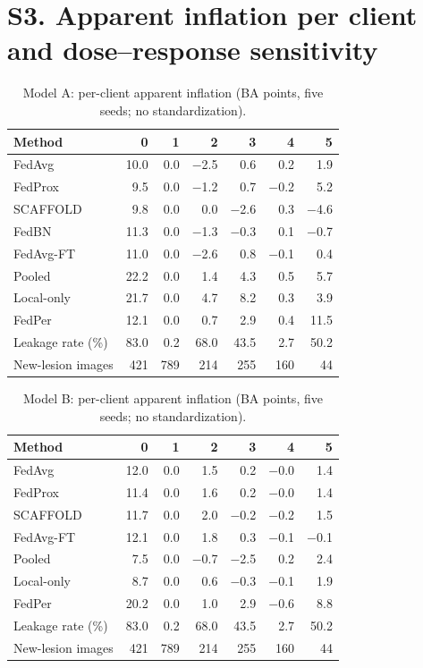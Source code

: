 \documentclass[10pt]{article}
\begin{document}
\section*{S3. Apparent inflation per client and dose--response sensitivity}
\begin{table}[!htbp]
\centering
\footnotesize
\caption{Model A: per-client apparent inflation (BA points, five seeds; no standardization).}
\label{tab:s3A}
\begin{tabular}{@{}lrrrrrr@{}}
\toprule
Method & 0 & 1 & 2 & 3 & 4 & 5 \\
\midrule
FedAvg & 10.0 & 0.0 & $-$2.5 & 0.6 & 0.2 & 1.9 \\
FedProx & 9.5 & 0.0 & $-$1.2 & 0.7 & $-$0.2 & 5.2 \\
SCAFFOLD & 9.8 & 0.0 & 0.0 & $-$2.6 & 0.3 & $-$4.6 \\
FedBN & 11.3 & 0.0 & $-$1.3 & $-$0.3 & 0.1 & $-$0.7 \\
FedAvg-FT & 11.0 & 0.0 & $-$2.6 & 0.8 & $-$0.1 & 0.4 \\
Pooled & 22.2 & 0.0 & 1.4 & 4.3 & 0.5 & 5.7 \\
Local-only & 21.7 & 0.0 & 4.7 & 8.2 & 0.3 & 3.9 \\
FedPer & 12.1 & 0.0 & 0.7 & 2.9 & 0.4 & 11.5 \\
\midrule
Leakage rate (\%) & 83.0 & 0.2 & 68.0 & 43.5 & 2.7 & 50.2 \\
New-lesion images & 421 & 789 & 214 & 255 & 160 & 44 \\
\bottomrule
\end{tabular}
\end{table}
\begin{table}[!htbp]
\centering
\footnotesize
\caption{Model B: per-client apparent inflation (BA points, five seeds; no standardization).}
\label{tab:s3B}
\begin{tabular}{@{}lrrrrrr@{}}
\toprule
Method & 0 & 1 & 2 & 3 & 4 & 5 \\
\midrule
FedAvg & 12.0 & 0.0 & 1.5 & 0.2 & $-$0.0 & 1.4 \\
FedProx & 11.4 & 0.0 & 1.6 & 0.2 & $-$0.0 & 1.4 \\
SCAFFOLD & 11.7 & 0.0 & 2.0 & $-$0.2 & $-$0.2 & 1.5 \\
FedAvg-FT & 12.1 & 0.0 & 1.8 & 0.3 & $-$0.1 & $-$0.1 \\
Pooled & 7.5 & 0.0 & $-$0.7 & $-$2.5 & 0.2 & 2.4 \\
Local-only & 8.7 & 0.0 & 0.6 & $-$0.3 & $-$0.1 & 1.9 \\
FedPer & 20.2 & 0.0 & 1.0 & 2.9 & $-$0.6 & 8.8 \\
\midrule
Leakage rate (\%) & 83.0 & 0.2 & 68.0 & 43.5 & 2.7 & 50.2 \\
New-lesion images & 421 & 789 & 214 & 255 & 160 & 44 \\
\bottomrule
\end{tabular}
\end{table}
\end{document}
